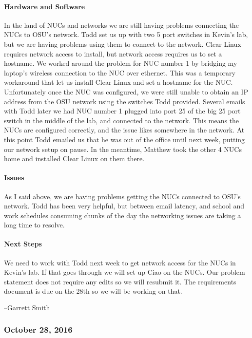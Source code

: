 \documentclass[10pt,onecolumn,journal,draftclsnofoot]{IEEEtran}
\begin{document}
\paragraph{Hardware and Software} 

In the land of NUCs and networks we are still having problems connecting
the NUCs to OSU's network. Todd set us up with two 5 port switches in
Kevin's lab, but we are having problems using them to connect to the
network. Clear Linux requires network access to install, but network
access requires us to set a hostname. We worked around the problem for
NUC number 1 by bridging my laptop's wireless connection to the NUC over
ethernet. This was a temporary workaround that let us install Clear
Linux and set a hostname for the NUC. Unfortunately once the NUC was
configured, we were still unable to obtain an IP address from the OSU
network using the switches Todd provided. Several emails with Todd later
we had NUC number 1 plugged into port 25 of the big 25 port switch in
the middle of the lab, and connected to the network. This means the NUCs
are configured correctly, and the issue likes somewhere in the network.
At this point Todd emailed us that he was out of the office until next
week, putting our network setup on pause. In the meantime, Matthew took
the other 4 NUCs home and installed Clear Linux on them there.

\paragraph{Issues} 

As I said above, we are having problems getting the NUCs connected to
OSU's network. Todd has been very helpful, but between email latency,
and school and work schedules consuming chunks of the day the networking
issues are taking a long time to resolve.

\paragraph{Next Steps} 

We need to work with Todd next week to get network access for the NUCs
in Kevin's lab. If that goes through we will set up Ciao on the NUCs.
Our problem statement does not require any edits so we will resubmit it.
The requirements document is due on the 28th so we will be working on
that.

--Garrett Smith

\subsubsection{October 28, 2016} 
\end{document}
